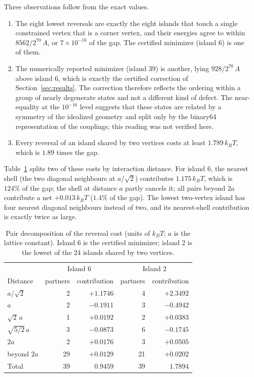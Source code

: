 \documentclass[11pt,a4paper]{article}
\theoremstyle{plain}
\theoremstyle{definition}
\theoremstyle{remark}
\newcommand{\kBT}{k_{B}T}
\begin{document}
Three observations follow from the exact values.
\begin{enumerate}[leftmargin=1.6em]
\item The eight lowest reversals are exactly the eight islands that touch a single constrained vertex that is a corner vertex, and their energies agree to within $8562/2^{70}\,A$, or $7\times10^{-16}$ of the gap. The certified minimizer (island 6) is one of them.
\item The numerically reported minimizer (island 39) is another, lying $928/2^{70}\,A$ above island 6, which is exactly the certified correction of Section~\ref{sec:results}. The correction therefore reflects the ordering within a group of nearly degenerate states and not a different kind of defect. The near-equality at the $10^{-16}$ level suggests that these states are related by a symmetry of the idealized geometry and split only by the binary64 representation of the couplings; this reading was not verified here.
\item Every reversal of an island shared by two vertices costs at least $1.789\,\kBT$, which is $1.89$ times the gap.
\end{enumerate}

Table~\ref{tab:shells} splits two of these costs by interaction distance. For island 6, the nearest shell (the two diagonal neighbours at $a/\sqrt2$) contributes $1.175\,\kBT$, which is $124\%$ of the gap; the shell at distance $a$ partly cancels it; all pairs beyond $2a$ contribute a net $+0.013\,\kBT$ ($1.4\%$ of the gap). The lowest two-vertex island has four nearest diagonal neighbours instead of two, and its nearest-shell contribution is exactly twice as large.

\begin{table}[t]
\centering\small
\caption{Pair decomposition of the reversal cost (units of $\kBT$; $a$ is the lattice constant). Island 6 is the certified minimizer; island 2 is the lowest of the 24 islands shared by two vertices.}
\label{tab:shells}
\begin{tabular}{@{}lrrrr@{}}
\toprule
 & \multicolumn{2}{c}{Island 6} & \multicolumn{2}{c}{Island 2}\\
Distance & partners & contribution & partners & contribution\\
\midrule
$a/\sqrt2$ & 2 & $+1.1746$ & 4 & $+2.3492$\\
$a$ & 2 & $-0.1911$ & 3 & $-0.4942$\\
$\sqrt2\,a$ & 1 & $+0.0192$ & 2 & $+0.0383$\\
$\sqrt{5/2}\,a$ & 3 & $-0.0873$ & 6 & $-0.1745$\\
$2a$ & 2 & $+0.0176$ & 3 & $+0.0505$\\
beyond $2a$ & 29 & $+0.0129$ & 21 & $+0.0202$\\
\midrule
Total & 39 & $0.9459$ & 39 & $1.7894$\\
\bottomrule
\end{tabular}
\end{table}
\end{document}
